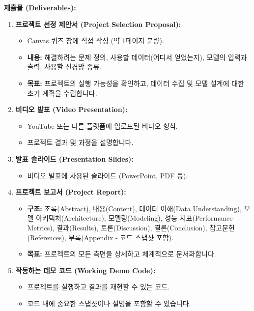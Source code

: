 \documentclass[11pt,a4paper]{article}
\begin{document}
\textbf{제출물 (Deliverables):}
\begin{enumerate}
    \item \textbf{프로젝트 선정 제안서 (Project Selection Proposal):}
        \begin{itemize}
            \item Canvas 퀴즈 창에 직접 작성 (약 1페이지 분량).
            \item \textbf{내용:} 해결하려는 문제 정의, 사용할 데이터(어디서 얻었는지), 모델의 입력과 출력, 사용할 신경망 종류.
            \item \textbf{목표:} 프로젝트의 실행 가능성을 확인하고, 데이터 수집 및 모델 설계에 대한 초기 계획을 수립합니다.
        \end{itemize}
    \item \textbf{비디오 발표 (Video Presentation):}
        \begin{itemize}
            \item YouTube 또는 다른 플랫폼에 업로드된 비디오 형식.
            \item 프로젝트 결과 및 과정을 설명합니다.
        \end{itemize}
    \item \textbf{발표 슬라이드 (Presentation Slides):}
        \begin{itemize}
            \item 비디오 발표에 사용된 슬라이드 (PowerPoint, PDF 등).
        \end{itemize}
    \item \textbf{프로젝트 보고서 (Project Report):}
        \begin{itemize}
            \item \textbf{구조:} 초록(Abstract), 내용(Content), 데이터 이해(Data Understanding), 모델 아키텍처(Architecture), 모델링(Modeling), 성능 지표(Performance Metrics), 결과(Results), 토론(Discussion), 결론(Conclusion), 참고문헌(References), 부록(Appendix - 코드 스냅샷 포함).
            \item \textbf{목표:} 프로젝트의 모든 측면을 상세하고 체계적으로 문서화합니다.
        \end{itemize}
    \item \textbf{작동하는 데모 코드 (Working Demo Code):}
        \begin{itemize}
            \item 프로젝트를 실행하고 결과를 재현할 수 있는 코드.
            \item 코드 내에 중요한 스냅샷이나 설명을 포함할 수 있습니다.
        \end{itemize}
\end{enumerate}
\end{document}
